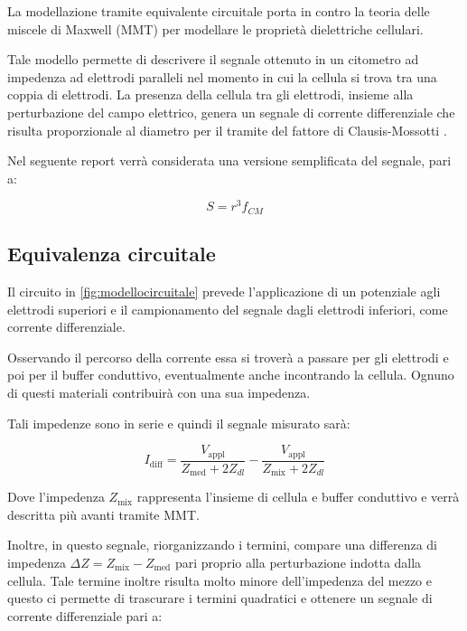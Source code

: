 La modellazione tramite equivalente circuitale porta in contro la teoria delle miscele di Maxwell (MMT) per modellare le proprietà dielettriche cellulari.

Tale modello permette di descrivere il segnale ottenuto in un citometro ad impedenza ad elettrodi paralleli nel momento in cui la cellula si trova tra una coppia di elettrodi. La presenza della cellula tra gli elettrodi, insieme alla perturbazione del campo elettrico, genera un segnale di corrente differenziale che risulta proporzionale al diametro per il tramite del fattore di Clausis-Mossotti \cite{bibid}.

Nel seguente report verrà considerata una versione semplificata del segnale, pari a:

\begin{equation}
	S=r^{3} f_{C M}
\end{equation}

\subsection{Equivalenza circuitale}

Il circuito in \cref{fig:modellocircuitale} prevede l'applicazione di un potenziale agli elettrodi superiori e il campionamento del segnale dagli elettrodi inferiori, come corrente differenziale.

Osservando il percorso della corrente essa si troverà a passare per gli elettrodi e poi per il buffer conduttivo, eventualmente anche incontrando la cellula. Ognuno di questi materiali contribuirà con una sua impedenza.

Tali impedenze sono in serie e quindi il segnale misurato sarà:

\begin{equation}
	I_{\operatorname{d i f f}}=\frac{V_{\operatorname{a p p l}}}{Z_{\operatorname{m e d}}+2 Z_{d l}}-\frac{V_{\operatorname{a p p l}}}{Z_{\operatorname{m i x}}+2 Z_{d l}}
\end{equation}

Dove l'impedenza $Z_{\operatorname{m i x}}$ rappresenta l'insieme di cellula e buffer conduttivo e verrà descritta più avanti tramite MMT.

Inoltre, in questo segnale, riorganizzando i termini, compare una differenza di impedenza $\Delta Z=Z_{\operatorname{m i x}}-Z_{\operatorname{m e d}}$ pari proprio alla perturbazione indotta dalla cellula.  Tale termine inoltre risulta molto minore dell'impedenza del mezzo e questo ci permette di trascurare i termini quadratici e ottenere un segnale di corrente differenziale pari a:

